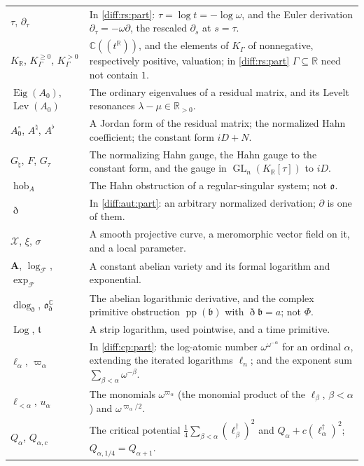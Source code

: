 \documentclass[11pt,letterpaper]{article}
\numberwithin{equation}{section}
\theoremstyle{definition}
\theoremstyle{remark}
\newcommand{\R}{\mathbb R}
\newcommand{\C}{\mathbb C}
\newcommand{\der}{\partial}
\newcommand{\Obs}{\mathfrak o}
\newcommand{\pp}{\operatorname{pp}}
\newcommand{\GL}{\operatorname{GL}}
\newcommand{\derT}{\der_{\tau}}
\newcommand{\KR}{K_{\R}}
\newcommand{\Eig}{\operatorname{Eig}}
\newcommand{\Lev}{\operatorname{Lev}}
\newcommand{\hob}{\operatorname{hob}}
\newcommand{\Dn}{\eth}
\newcommand{\dlog}{\operatorname{dlog}}
\newcommand{\Log}{\operatorname{Log}}
\begin{document}
\begin{longtable}{@{}L{0.17\textwidth}L{0.76\textwidth}@{}}
$\tau$, $\derT$ & In \cref{diff:rs:part}: $\tau=\log t=-\log\omega$, and the
Euler derivation $\derT=-\omega\der$, the rescaled $\der_{s}$ at $s=\tau$. \\
$\KR$, $K_{\Gamma}^{\geq0}$, $K_{\Gamma}^{>0}$ & $\C((t^{\R}))$, and the elements
of $K_{\Gamma}$ of nonnegative, respectively positive, valuation; in
\cref{diff:rs:part} $\Gamma\subseteq\R$ need not contain $1$. \\
$\Eig(A_{0})$, $\Lev(A_{0})$ & The ordinary eigenvalues of a residual matrix, and
its Levelt resonances $\lambda-\mu\in\R_{>0}$. \\
$A_{0}^{\circ}$, $A^{\natural}$, $A^{\flat}$ & A Jordan form of the residual
matrix; the normalized Hahn coefficient; the constant form $iD+N$. \\
$G_{\natural}$, $F$, $G_{\tau}$ & The normalizing Hahn gauge, the Hahn gauge to the
constant form, and the gauge in $\GL_{n}(\KR[\tau])$ to $iD$. \\
$\hob_{A}$ & The Hahn obstruction of a regular-singular system; not $\Obs$. \\
$\Dn$ & In \cref{diff:aut:part}: an arbitrary normalized derivation; $\der$ is
one of them. \\
$\mathcal X$, $\xi$, $\sigma$ & A smooth projective curve, a meromorphic vector
field on it, and a local parameter. \\
$\mathbf A$, $\log_{\mathcal F}$, $\exp_{\mathcal F}$ & A constant abelian variety
and its formal logarithm and exponential. \\
$\dlog_{\Dn}$, $\Obs^{\C}_{\Dn}$ & The abelian logarithmic derivative, and the
complex primitive obstruction $\pp(\mathfrak b)$ with $\Dn\mathfrak b=a$; not $\Phi$. \\
$\Log$, $\mathfrak t$ & A strip logarithm, used pointwise, and a time
primitive. \\
$\ell_{\alpha}$, $\varpi_{\alpha}$ & In \cref{diff:cp:part}: the log-atomic number
$\omega^{\omega^{-\alpha}}$ for an ordinal $\alpha$, extending the iterated
logarithms $\ell_{n}$; and the exponent sum $\sum_{\beta<\alpha}\omega^{-\beta}$. \\
$\ell_{<\alpha}$, $u_{\alpha}$ & The monomials $\omega^{\varpi_{\alpha}}$ (the
monomial product of the $\ell_{\beta}$, $\beta<\alpha$) and
$\omega^{\varpi_{\alpha}/2}$. \\
$Q_{\alpha}$, $Q_{\alpha,c}$ & The critical potential
$\frac14\sum_{\beta<\alpha}(\ell_{\beta}^{\dagger})^{2}$ and
$Q_{\alpha}+c(\ell_{\alpha}^{\dagger})^{2}$; $Q_{\alpha,1/4}=Q_{\alpha+1}$. \\

\end{longtable}
\end{document}
